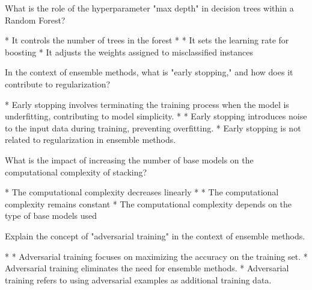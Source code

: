 \documentclass[11pt]{extarticle}
\begin{document}
\begin{exercise}
    What is the role of the hyperparameter "max depth" in decision trees within a Random Forest?
    \begin{choice}
        * It controls the number of trees in the forest
        * 
        * It sets the learning rate for boosting
        * It adjusts the weights assigned to misclassified instances
    \end{choice}
\end{exercise}
\begin{solution}
\end{solution}

\begin{exercise}
    In the context of ensemble methods, what is "early stopping," and how does it contribute to regularization?
    \begin{choice}
        * Early stopping involves terminating the training process when the model is underfitting, contributing to model simplicity.
        * 
        * Early stopping introduces noise to the input data during training, preventing overfitting.
        * Early stopping is not related to regularization in ensemble methods.
    \end{choice}
\end{exercise}
\begin{solution}
\end{solution}

\begin{exercise}
    What is the impact of increasing the number of base models on the computational complexity of stacking?
    \begin{choice}
        * The computational complexity decreases linearly
        * 
        * The computational complexity remains constant
        * The computational complexity depends on the type of base models used
    \end{choice}
\end{exercise}
\begin{solution}
\end{solution}

\begin{exercise}
    Explain the concept of "adversarial training" in the context of ensemble methods.
    \begin{choice}
        * 
        * Adversarial training focuses on maximizing the accuracy on the training set.
        * Adversarial training eliminates the need for ensemble methods.
        * Adversarial training refers to using adversarial examples as additional training data.
    \end{choice}
\end{exercise}
\begin{solution}
\end{solution}
\end{document}
